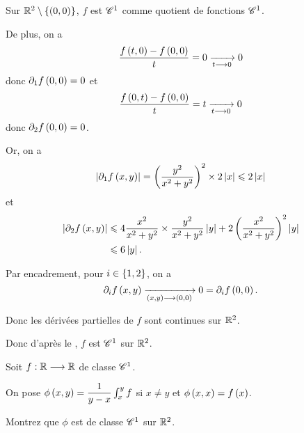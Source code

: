 \begin{corr}
Sur \(\mathbb{R}^2\setminus\left\lbrace\left(0,0\right)\right\rbrace\), \(f\) est \(\mathscr{C}^{1}\) comme quotient de fonctions \(\mathscr{C}^{1}\).

De plus, on a \[\dfrac{f\left(t,0\right)-f\left(0,0\right)}{t}=0\xrightarrow[t\longrightarrow0]{}0\] donc \(\pdif{1}f\paren{0,0}=0\) et \[\dfrac{f\left(0,t\right)-f\left(0,0\right)}{t}=t\xrightarrow[t\longrightarrow0]{}0\] donc \(\pdif{2}f\paren{0,0}=0\).

Or, on a \[\abs{\pdif{1}f\paren{x,y}}=\paren{\dfrac{y^2}{x^2+y^2}}^2\times2\abs{x}\leq2\abs{x}\] et \[\begin{aligned}
\abs{\pdif{2}f\paren{x,y}}&\leq4\dfrac{x^2}{x^2+y^2}\times\dfrac{y^2}{x^2+y^2}\abs{y}+2\paren{\dfrac{x^2}{x^2+y^2}}^2\abs{y} \\
&\leq6\abs{y}.
\end{aligned}\]

Par encadrement, pour \(i\in\left\lbrace1,2\right\rbrace\), on a \[\pdif{i}f\paren{x,y}\tendqd{\paren{x,y}\to\paren{0,0}}0=\pdif{i}f\paren{0,0}.\]

Donc les dérivées partielles de \(f\) sont continues sur \(\mathbb{R}^2\).

Donc d'après le , \(f\) est \(\mathscr{C}^{1}\) sur \(\mathbb{R}^2\).
\end{corr}

\begin{exo}
Soit \(f:\mathbb{R}\longrightarrow\mathbb{R}\) de classe \(\mathscr{C}^{1}\).

On pose \(\phi\left(x,y\right)=\dfrac{1}{y-x}\int_x^yf\) si \(x\not=y\) et \(\phi\left(x,x\right)=f\left(x\right)\).

Montrez que \(\phi\) est de classe \(\mathscr{C}^{1}\) sur \(\mathbb{R}^2\).
\end{exo}

